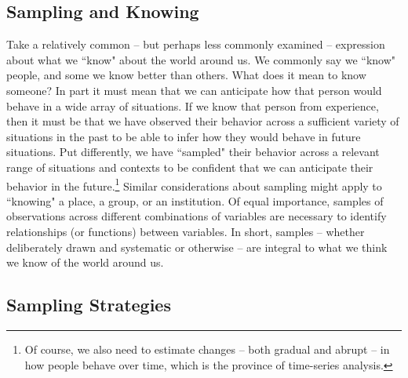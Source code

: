 \documentclass[11pt,openany]{book}\usepackage[]{graphicx}\usepackage[]{color}
\begin{document}
{\subsection{Sampling and Knowing} 

Take a relatively common -- but perhaps less commonly examined -- expression about what we ``know" about the world around us. We commonly say we ``know" people, and some we know better than others. What does it mean to know someone? In part it must mean that we can anticipate how that person would behave in a wide array of situations. If we know that person from experience, then it must be that we have observed their behavior across a 
sufficient variety of situations in the past to be able to infer how they would behave in  future situations. Put differently, we have ``sampled" their behavior across a relevant range of situations and contexts to be confident that we can anticipate their behavior in the future.\footnote{Of course, we also need to estimate changes -- both gradual and abrupt -- in how people behave over time, which is the province of time-series analysis.} Similar considerations about sampling might apply to ``knowing" a place, a group, or an institution. Of equal importance, samples of observations
across different combinations of variables are necessary to identify relationships (or functions) between variables.  In short, samples -- whether deliberately drawn and systematic or otherwise -- are integral to what we think we know of the world around us.

\subsection{Sampling Strategies} 

}
\end{document}
